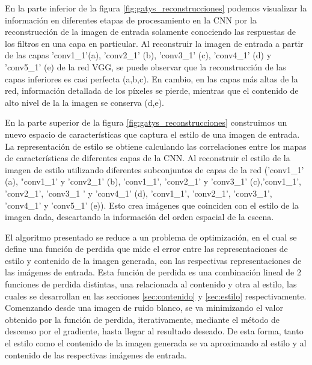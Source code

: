 \documentclass[a4paper,11pt,spanish]{book}
\begin{document}
      En la parte inferior de la figura \ref{fig:gatys_reconstrucciones} podemos visualizar la información en diferentes etapas de procesamiento en la CNN por la reconstrucción
      de la imagen de entrada solamente conociendo las respuestas de los filtros en una capa en particular. 
      Al reconstruir la imagen de entrada a partir de las capas 'conv1\_1'(a), 'conv2\_1' (b), 'conv3\_1' (c), 'conv4\_1' (d) y 'conv5\_1' (e) de la red VGG,
      se puede observar que la reconstrucción de las capas inferiores es casi perfecta (a,b,c). 
      En cambio, en las capas más altas de la red, información detallada de los píxeles se pierde, mientras que el contenido de alto nivel  de la la imagen se conserva (d,e). 
	
      En la parte superior de la figura \ref{fig:gatys_reconstrucciones} construimos un nuevo espacio de características que captura el estilo de una imagen de entrada.
      La representación de estilo se obtiene calculando las correlaciones entre los mapas de características de diferentes capas de la CNN. Al reconstruir el estilo de la imagen de estilo
      utilizando diferentes subconjuntos de capas de la red ('conv1\_1' (a), "conv1\_1' y 'conv2\_1' (b), 'conv1\_1', 'conv2\_1' y 'conv3\_1' (c),'conv1\_1', 'conv2\_1', 'conv3\_1 ' y 'conv4\_1' (d),
      'conv1\_1', 'conv2\_1', 'conv3\_1', 'conv4\_1' y 'conv5\_1' (e)).
      Esto crea imágenes que coinciden con el estilo de la imagen dada, descartando la información del orden espacial de la escena.
      
      El algoritmo presentado se reduce a un problema de optimización, en el cual se define una función de perdida que mide el error entre las representaciones de estilo y contenido 
      de la imagen generada, con las respectivas representaciones de las imágenes de entrada.
      Esta función de perdida es una combinación lineal de 2 funciones de perdida distintas, una relacionada al contenido y otra al estilo, las cuales se desarrollan en las secciones \ref{sec:contenido} y \ref{sec:estilo} respectivamente.
      Comenzando desde una imagen de ruido blanco, se va minimizando el valor obtenido por la función de perdida, iterativamente, mediante el método de descenso por el gradiente, hasta 
      llegar al resultado deseado.
      De esta forma, tanto el estilo como el contenido de la imagen generada se va aproximando al estilo y al contenido de las respectivas imágenes de entrada.
      
\end{document}
